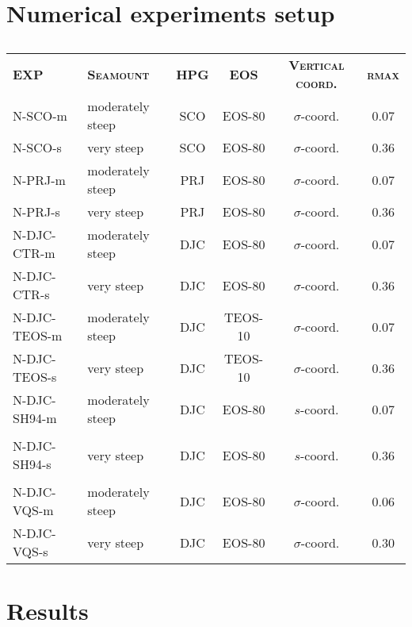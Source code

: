 \documentclass[authoryear]{elsarticle}
\begin{document}
\section{Numerical experiments setup} \label{exp_setup}
\begin{table}[htp]
	\centering
	\hspace{-7cm}
	\begin{scriptsize}
		\begin{tabular}{llcccc}
			\cmidrule[0.5pt]{1-6}
			\textsc{\textbf{EXP}} & \textsc{\textbf{Seamount}} & \textsc{\textbf{HPG}} & \textsc{\textbf{EOS}} & \textsc{\textbf{Vertical coord.}} & \textsc{\textbf{rmax}} \\
			\cmidrule[0.5pt]{1-6}
			N-SCO-m      & moderately steep & SCO & EOS-80  & $\sigma$-coord. & 0.07 \\
			N-SCO-s      & very steep       & SCO & EOS-80  & $\sigma$-coord. & 0.36 \\
			N-PRJ-m      & moderately steep & PRJ & EOS-80  & $\sigma$-coord. & 0.07 \\
			N-PRJ-s      & very steep       & PRJ & EOS-80  & $\sigma$-coord. & 0.36 \\
			N-DJC-CTR-m  & moderately steep & DJC & EOS-80  & $\sigma$-coord. & 0.07 \\
			N-DJC-CTR-s  & very steep       & DJC & EOS-80  & $\sigma$-coord. & 0.36 \\
			N-DJC-TEOS-m & moderately steep & DJC & TEOS-10 & $\sigma$-coord. & 0.07 \\
			N-DJC-TEOS-s & very steep       & DJC & TEOS-10 & $\sigma$-coord. & 0.36 \\
			N-DJC-SH94-m & moderately steep & DJC & EOS-80  & $s$-coord.      & 0.07 \\
			             &                  &     &         & \cite{Song1994}  &      \\
			N-DJC-SH94-s & very steep       & DJC & EOS-80  & $s$-coord.      & 0.36 \\
			             &                  &     &         & \cite{Song1994}  &      \\	
			N-DJC-VQS-m  & moderately steep & DJC & EOS-80  & $\sigma$-coord. & 0.06 \\
			N-DJC-VQS-s  & very steep       & DJC & EOS-80  & $\sigma$-coord. & 0.30 \\              
			\cmidrule[.5pt]{1-6}
		\end{tabular}
	\end{scriptsize}
	\hspace{-7cm}
	\caption{ }
\end{table}

\section{Results} \label{results} 




\end{document}
